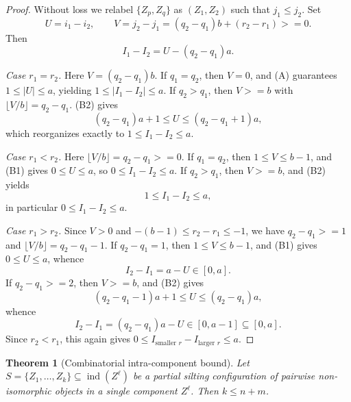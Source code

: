\documentclass[11pt, a4paper]{article}
\newtheorem{theorem}{Theorem}[section]
\theoremstyle{definition}
\def\ge{>=}%
\def\mathcal#1{#1}%
\begin{document}
\begin{proof}
Without loss we relabel $\{Z_p, Z_q\}$ as $(Z_1, Z_2)$ such that $j_1 \le j_2$. Set
\[
  U = i_1 - i_2,
  \qquad
  V = j_2 - j_1 = (q_2 - q_1)b + (r_2 - r_1) \ge 0.
\]
Then
\[
  I_1 - I_2 = U - (q_2 - q_1)a.
\]

\emph{Case $r_1 = r_2$.} Here $V = (q_2 - q_1)b$. If $q_1 = q_2$, then $V = 0$, and (A) guarantees $1 \le |U| \le a$, yielding $1 \le |I_1 - I_2| \le a$. If $q_2 > q_1$, then $V \ge b$ with $\lfloor V/b \rfloor = q_2 - q_1$. (B2) gives
\[
  (q_2 - q_1)a + 1 \le U \le (q_2 - q_1 + 1)a,
\]
which reorganizes exactly to $1 \le I_1 - I_2 \le a$.

\emph{Case $r_1 < r_2$.} Here $\lfloor V/b \rfloor = q_2 - q_1 \ge 0$. If $q_1 = q_2$, then $1 \le V \le b-1$, and (B1) gives $0 \le U \le a$, so $0 \le I_1 - I_2 \le a$. If $q_2 > q_1$, then $V \ge b$, and (B2) yields
\[
  1 \le I_1 - I_2 \le a,
\]
in particular $0 \le I_1 - I_2 \le a$.

\emph{Case $r_1 > r_2$.} Since $V > 0$ and $-(b-1) \le r_2 - r_1 \le -1$, we have $q_2 - q_1 \ge 1$ and $\lfloor V/b \rfloor = q_2 - q_1 - 1$. If $q_2 - q_1 = 1$, then $1 \le V \le b-1$, and (B1) gives $0 \le U \le a$, whence
\[
  I_2 - I_1 = a - U \in [0, a].
\]
If $q_2 - q_1 \ge 2$, then $V \ge b$, and (B2) gives
\[
  (q_2 - q_1 - 1)a + 1 \le U \le (q_2 - q_1)a,
\]
whence
\[
  I_2 - I_1 = (q_2 - q_1)a - U \in [0, a-1] \subseteq [0, a].
\]
Since $r_2 < r_1$, this again gives $0 \le I_{\text{smaller } r} - I_{\text{larger } r} \le a$.
\end{proof}

\begin{theorem}[Combinatorial intra-component bound]\label{thm:sharp-combinatorial}
Let $S = \{Z_1, \ldots, Z_k\} \subseteq \operatorname{ind}(\mathcal Z^\ell)$ be a partial silting configuration of pairwise non-isomorphic objects in a single component $\mathcal Z^\ell$. Then $k \le n + m$.
\end{theorem}
\end{document}
